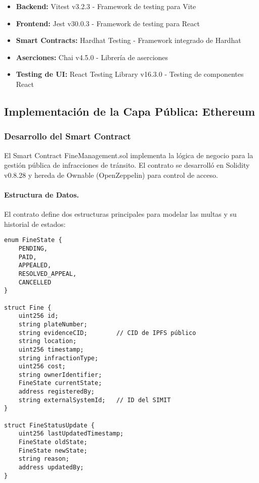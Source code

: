 \begin{itemize}
    \item \textbf{Backend:} Vitest v3.2.3 - Framework de testing para Vite
    \item \textbf{Frontend:} Jest v30.0.3 - Framework de testing para React
    \item \textbf{Smart Contracts:} Hardhat Testing - Framework integrado de Hardhat
    \item \textbf{Aserciones:} Chai v4.5.0 - Librería de aserciones
    \item \textbf{Testing de UI:} React Testing Library v16.3.0 - Testing de componentes React
\end{itemize}

\subsection{Implementación de la Capa Pública: Ethereum}

\subsubsection{Desarrollo del Smart Contract}

El Smart Contract FineManagement.sol implementa la lógica de negocio para la gestión pública de infracciones de tránsito. El contrato se desarrolló en Solidity v0.8.28 y hereda de Ownable (OpenZeppelin) para control de acceso.

\paragraph{Estructura de Datos.}
El contrato define dos estructuras principales para modelar las multas y su historial de estados:

\begin{verbatim}
enum FineState { 
    PENDING, 
    PAID, 
    APPEALED, 
    RESOLVED_APPEAL, 
    CANCELLED 
}

struct Fine {
    uint256 id;
    string plateNumber;
    string evidenceCID;        // CID de IPFS público
    string location;
    uint256 timestamp;
    string infractionType;
    uint256 cost;
    string ownerIdentifier;
    FineState currentState;
    address registeredBy;
    string externalSystemId;   // ID del SIMIT
}

struct FineStatusUpdate {
    uint256 lastUpdatedTimestamp;
    FineState oldState;
    FineState newState;
    string reason;
    address updatedBy;
}
\end{verbatim}


